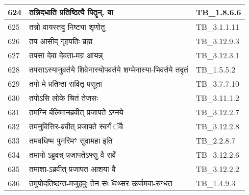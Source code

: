\documentclass[17pt]{extarticle}
\begin{document}
\begin{longtable}{||p{0.4in}||p{4.9in}||p{0.9in}||}
    624 & तन्निदधाति प्रतिष्ठित्यै पितॄन्. वा & TB\_1.8.6.6       \\
    
    \hline
        
    625 & तन्नो वायस्तदु निष्ट्या शृणोतु & TB\_3.1.1.11       \\
    
    \hline
        
    626 & तप आसीद् गृहपतिः ब्रह्म & TB\_3.12.9.3       \\
    
    \hline
        
    627 & तपसा देवा देवता{-}मग्र आयन्न् & TB\_3.12.3.1       \\
    
    \hline
        
    628 & तपसाऽस्यानुवर्तये शिवेनास्योपवर्तये शग्मेनास्या{-}भिवर्तये तदृतं & TB\_1.5.5.2       \\
    
    \hline
        
    629 & तपो मे प्रतिष्ठा सवितृ{-}प्रसूता & TB\_3.7.7.10       \\
    
    \hline
        
    630 & तपोऽसि लोके श्रितं तेजसः & TB\_3.11.1.2       \\
    
    \hline
        
    631 & तमग्नि र्बलिमानब्रवीत् प्रजापते ऽग्नये & TB\_3.12.2.7       \\
    
    \hline
        
    632 & तमनुवित्तिर{-}ब्रवीत् प्रजापते स्वर्गं ॅवै & TB\_3.12.2.8       \\
    
    \hline
        
    633 & तमवधिष्म पुनरिमꣳ सुवामहा इति & TB\_2.2.8.7       \\
    
    \hline
        
    634 & तमापो{-}ऽब्रुवन्न् प्रजापतेऽफ्सु वै सर्वे & TB\_3.12.2.6       \\
    
    \hline
        
    635 & तमाशा{-}ऽब्रवीत् प्रजापत आशया वै & TB\_3.12.2.2       \\
    
    \hline
        
    636 & तमुपोदतिष्ठन्त{-}मजुहवुः तेन संॅवथ्सर ऊर्जमवा{-}रुन्धत & TB\_1.4.9.3       \\
    

\end{longtable}
\end{document}
